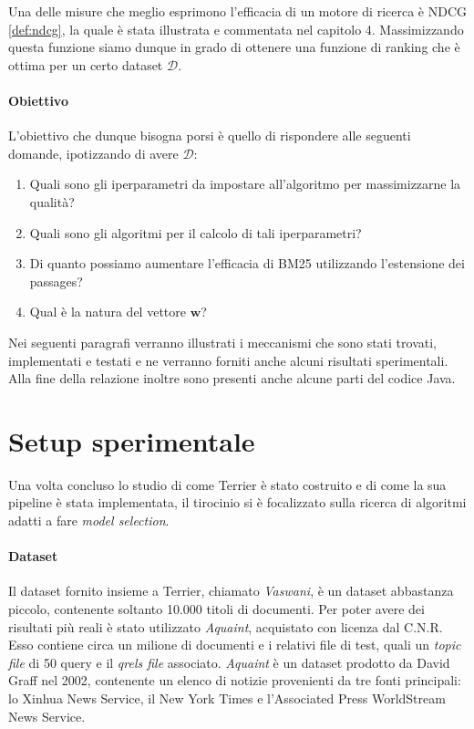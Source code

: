 Una delle misure che meglio esprimono l'efficacia di un motore di ricerca è NDCG \ref{def:ndcg}, la quale è
stata illustrata e commentata nel capitolo 4.
Massimizzando questa funzione siamo dunque in grado di ottenere una funzione di ranking che
è ottima per un certo dataset $\mathcal{D}$.

\paragraph{Obiettivo}
L'obiettivo che dunque bisogna porsi è quello di rispondere alle seguenti domande, ipotizzando
di avere $\mathcal{D}$:

\begin{enumerate}
	\item Quali sono gli iperparametri da impostare all'algoritmo per massimizzarne la qualità?
	\item Quali sono gli algoritmi per il calcolo di tali iperparametri?
	\item Di quanto possiamo aumentare l'efficacia di BM25 utilizzando l'estensione dei passages?
	\item Qual è la natura del vettore $\boldsymbol{w}$?
\end{enumerate}

Nei seguenti paragrafi verranno illustrati i meccanismi che sono stati
trovati, implementati e testati e ne verranno forniti anche alcuni risultati
sperimentali. Alla fine della relazione inoltre sono presenti anche alcune
parti del codice Java.

\section{Setup sperimentale}

Una volta concluso lo studio di come Terrier è stato costruito e di come la sua pipeline è stata implementata,
il tirocinio si è focalizzato sulla ricerca di algoritmi adatti a fare \textit{model selection}.

\paragraph{Dataset}
Il dataset fornito insieme a Terrier, chiamato \textit{Vaswani}, è un dataset abbastanza piccolo,
contenente soltanto 10.000 titoli di documenti. Per poter avere dei risultati più
reali è stato utilizzato \textit{Aquaint}, acquistato con licenza dal C.N.R.
Esso contiene circa un milione di documenti e i relativi file di test, quali
un \textit{topic file} di 50 query e il \textit{qrels file} associato.
\textit{Aquaint} è un dataset prodotto da David Graff nel 2002,
contenente un elenco di notizie provenienti da tre fonti principali:
lo Xinhua News Service, il New York Times e l'Associated Press WorldStream News Service.


